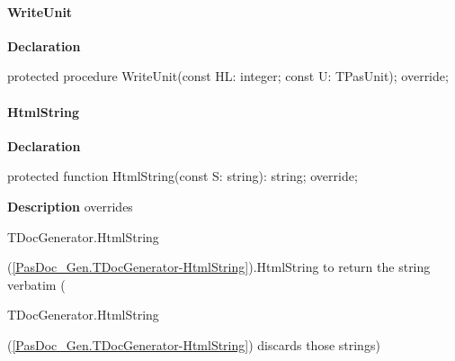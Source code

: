 \documentclass{report}
\newif\ifpdf
\begin{document}
\paragraph*{WriteUnit}\hspace*{\fill}

\label{PasDoc_GenHtml.TGenericHTMLDocGenerator-WriteUnit}
\begin{list}{}{
\setlength{\itemindent}{0cm}
\setlength{\listparindent}{0cm}
\setlength{\leftmargin}{\evensidemargin}
\addtolength{\leftmargin}{\tmplength}
\settowidth{\labelsep}{X}
\addtolength{\leftmargin}{\labelsep}
\setlength{\labelwidth}{\tmplength}
}
\item[\textbf{Declaration}\hfill]
\ifpdf
\begin{flushleft}
\fi
\begin{ttfamily}
protected procedure WriteUnit(const HL: integer; const U: TPasUnit); override;\end{ttfamily}

\ifpdf
\end{flushleft}
\fi

\end{list}
\paragraph*{HtmlString}\hspace*{\fill}

\label{PasDoc_GenHtml.TGenericHTMLDocGenerator-HtmlString}
\begin{list}{}{
\setlength{\itemindent}{0cm}
\setlength{\listparindent}{0cm}
\setlength{\leftmargin}{\evensidemargin}
\addtolength{\leftmargin}{\tmplength}
\settowidth{\labelsep}{X}
\addtolength{\leftmargin}{\labelsep}
\setlength{\labelwidth}{\tmplength}
}
\item[\textbf{Declaration}\hfill]
\ifpdf
\begin{flushleft}
\fi
\begin{ttfamily}
protected function HtmlString(const S: string): string; override;\end{ttfamily}

\ifpdf
\end{flushleft}
\fi

\par
\item[\textbf{Description}]
overrides \begin{ttfamily}TDocGenerator.HtmlString\end{ttfamily}(\ref{PasDoc_Gen.TDocGenerator-HtmlString}).HtmlString to return the string verbatim (\begin{ttfamily}TDocGenerator.HtmlString\end{ttfamily}(\ref{PasDoc_Gen.TDocGenerator-HtmlString}) discards those strings)

\end{list}
\end{document}
